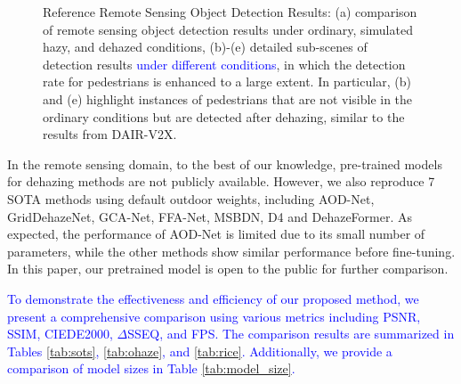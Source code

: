 \documentclass[lettersize,journal]{IEEEtran}
\begin{document}
\begin{figure}[pht]
    \caption{Reference Remote Sensing Object Detection Results: (a) comparison of remote sensing object detection results under ordinary, simulated hazy, and dehazed conditions, (b)-(e) detailed sub-scenes of detection results \textcolor{blue}{under different conditions}, in which the detection rate for pedestrians is enhanced to a large extent. In particular, (b) and (e) highlight instances of pedestrians that are not visible in the ordinary conditions but are detected after dehazing, similar to the results from DAIR-V2X.}
    
    \label{remote_object_detection}
    
\end{figure}

In the remote sensing domain, to the best of our knowledge, pre-trained models for dehazing methods are not publicly available. However, we also reproduce 7 SOTA methods using default outdoor weights, including AOD-Net\cite{li2017aod}, GridDehazeNet\cite{liu2019griddehazenet}, GCA-Net\cite{chen2019gated}, FFA-Net\cite{qin2020ffa}, MSBDN\cite{msbdn2020}, D4\cite{yang2022d4} and DehazeFormer\cite{dehazeformer}. As expected, the performance of AOD-Net is limited due to its small number of parameters, while the other methods show similar performance before fine-tuning. In this paper, our pretrained model is open to the public for further comparison.

\textcolor{blue}{To demonstrate the effectiveness and efficiency of our proposed method, we present a comprehensive comparison using various metrics including PSNR, SSIM, CIEDE2000, $\Delta$SSEQ, and FPS. The comparison results are summarized in Tables \ref{tab:sots}, \ref{tab:ohaze}, and \ref{tab:rice}. Additionally, we provide a comparison of model sizes in Table \ref{tab:model_size}.}
\end{document}
